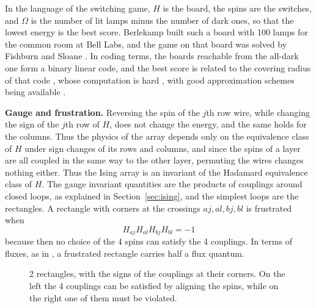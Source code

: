 \documentclass[11pt,a4paper]{article}
\theoremstyle{remark}
\begin{document}
In the language of the switching game, $H$ is the board, the spins are the switches, and $\Omega$ is the number of lit lamps minus the number of dark ones, so that the lowest energy is the best score. Berlekamp built such a board with 100 lamps for the common room at Bell Labs, and the game on that board was solved by Fishburn and Sloane \cite{fsl}. In coding terms, the boards reachable from the all-dark one form a binary linear code, and the best score is related to the covering radius of that code \cite{slo}, whose computation is hard \cite{rvi}, with good approximation schemes being available \cite{kas}.

\medskip

\noindent\textbf{Gauge and frustration.}
Reversing the spin of the $j$th row wire, while changing the sign of the $j$th row of $H$, does not change the energy, and the same holds for the columns. Thus the physics of the array depends only on the equivalence class of $H$ under sign changes of its rows and columns, and since the spins of a layer are all coupled in the same way to the other layer, permuting the wires changes nothing either. Thus the Ising array is an invariant of the Hadamard equivalence class of $H$. The gauge invariant quantities are the products of couplings around closed loops, as explained in Section~\ref{sec:ising}, and the simplest loops are the rectangles. A rectangle with corners at the crossings $aj,al,bj,bl$ is frustrated when
\[
 H_{aj}H_{al}H_{bj}H_{bl}=-1
\]
because then no choice of the 4 spins can satisfy the 4 couplings. In terms of fluxes, as in \cite{cot}, a frustrated rectangle carries half a flux quantum.

\begin{figure}[htb!]
\centering
{}
\caption{2 rectangles, with the signs of the couplings at their corners. On the left the 4 couplings can be satisfied by aligning the spins, while on the right one of them must be violated.}\label{fig:frustration}
\end{figure}
\end{document}
